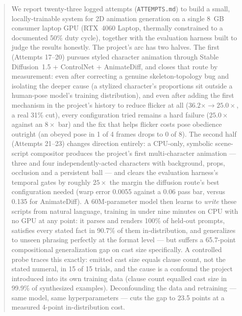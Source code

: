 \documentclass[11pt]{article}
\begin{document}
\begin{abstract}
We report twenty-three logged attempts (\texttt{ATTEMPTS.md}) to build a
small, locally-trainable system for 2D animation generation on a single
8~GB consumer laptop GPU (RTX~4060 Laptop, thermally constrained to a
documented 50\% duty cycle), together with the evaluation harness built to
judge the results honestly. The project's arc has two halves. The first
(Attempts 17--20) pursues styled character animation through Stable
Diffusion~1.5 + ControlNet + AnimateDiff, and closes that route by
measurement: even after correcting a genuine skeleton-topology bug and
isolating the deeper cause (a stylized character's proportions sit outside
a human-pose model's training distribution), and even after adding the
first mechanism in the project's history to reduce flicker at all
($36.2\times \rightarrow 25.0\times$, a real 31\% cut), every configuration
tried remains a hard failure ($25.0\times$ against an $8\times$ bar) and
the fix that helps flicker costs pose obedience outright (an obeyed pose
in 1 of 4 frames drops to 0 of 8). The second half (Attempts 21--23)
changes direction entirely: a CPU-only, symbolic scene-script compositor
produces the project's first multi-character animation --- three and four
independently-acted characters with background, props, occlusion and a
persistent ball --- and clears the evaluation harness's temporal gates by
roughly $25\times$ the margin the diffusion route's best configuration
needed (warp error 0.0055 against a 0.06 pass bar, versus 0.135 for
AnimateDiff). A 60M-parameter model then learns to \emph{write} these
scripts from natural language, training in under nine minutes on CPU with
no GPU at any point: it parses and renders 100\% of held-out prompts,
satisfies every stated fact in 90.7\% of them in-distribution, and
generalizes to unseen phrasing perfectly at the format level --- but
suffers a 65.7-point compositional generalization gap on cast size
specifically. A controlled probe traces this exactly: emitted cast size
equals clause count, not the stated numeral, in 15 of 15 trials, and the
cause is a confound the project introduced into its own training data
(clause count equalled cast size in 99.9\% of synthesized examples).
Deconfounding the data and retraining --- same model, same
hyperparameters --- cuts the gap to 23.5 points at a measured 4-point
in-distribution cost.


\end{abstract}
\end{document}
